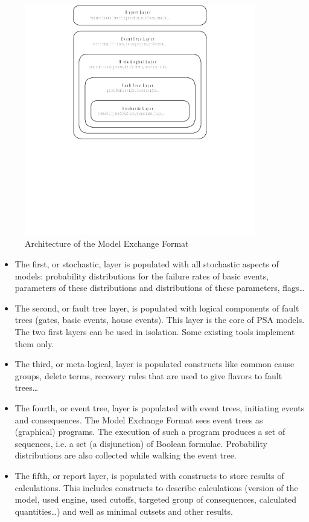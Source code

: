 \documentclass[11pt]{article}
\begin{document}
\begin{figure}[htbp]

\includegraphics[width=0.9\textwidth]{./word/media/image3.png}
\caption{\label{fig:orgb04954f}
Architecture of the Model Exchange Format}
\end{figure}

\begin{itemize}
\item The first, or stochastic, layer is populated with all stochastic
aspects of models: probability distributions for the failure rates of
basic events, parameters of these distributions and distributions of
these parameters, flags\ldots{}

\item The second, or fault tree layer, is populated with logical components
of fault trees (gates, basic events, house events). This layer is the
core of PSA models. The two first layers can be used in isolation.
Some existing tools implement them only.

\item The third, or meta-logical, layer is populated constructs like common
cause groups, delete terms, recovery rules that are used to give
flavors to fault trees\ldots{}

\item The fourth, or event tree, layer is populated with event trees,
initiating events and consequences. The Model Exchange Format sees
event trees as (graphical) programs. The execution of such a program
produces a set of sequences, i.e. a set (a disjunction) of Boolean
formulae. Probability distributions are also collected while walking
the event tree.

\item The fifth, or report layer, is populated with constructs to store
results of calculations. This includes constructs to describe
calculations (version of the model, used engine, used cutoffs,
targeted group of consequences, calculated quantities\ldots{}) and well as
minimal cutsets and other results.
\end{itemize}
\end{document}
